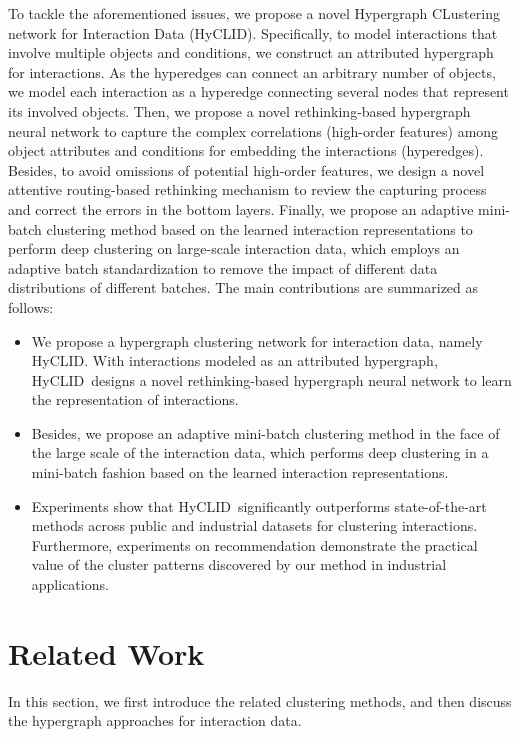 \documentclass[11pt]{article}
\def\modelname{HyCLID}
\begin{document}
To tackle the aforementioned issues, we propose a novel Hypergraph CLustering network for Interaction Data (\modelname).
Specifically, to model interactions that involve multiple objects and conditions, we construct an attributed hypergraph for interactions. As the hyperedges can connect an arbitrary number of objects, we model each interaction as a hyperedge connecting several nodes that represent its involved objects. Then, we propose a novel rethinking-based hypergraph neural network to capture the complex correlations (high-order features) among object attributes and conditions for embedding the interactions (hyperedges). Besides, to avoid omissions of potential high-order features, we design a novel attentive routing-based rethinking mechanism to review the capturing process and correct the errors in the bottom layers. Finally, we propose an adaptive mini-batch clustering method based on the learned interaction representations to perform deep clustering on large-scale interaction data, which employs an adaptive batch standardization to remove the impact of different data distributions of different batches.
The main contributions are summarized as follows:

\begin{itemize} %
	\item We propose a hypergraph clustering network for interaction data, namely \modelname. With interactions modeled as an attributed hypergraph, \modelname~designs a novel rethinking-based hypergraph neural network to learn the representation of interactions.
	
	\item Besides, we propose an adaptive mini-batch clustering method in the face of the large scale of the interaction data, which performs deep clustering in a mini-batch fashion based on the learned interaction representations.
	
	\item Experiments show that \modelname~significantly outperforms state-of-the-art methods across public and industrial datasets for clustering interactions. Furthermore, experiments on recommendation demonstrate the practical value of the cluster patterns discovered by our method in industrial applications.
\end{itemize}


\section{Related Work}
In this section, we first introduce the related clustering methods, and then discuss the hypergraph approaches for interaction data.
\end{document}
